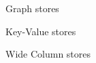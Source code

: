 \documentclass{llncs}
\begin{document}
    Graph stores
    
    
    Key-Value stores
    
    Wide Column stores
    
\end{document}
